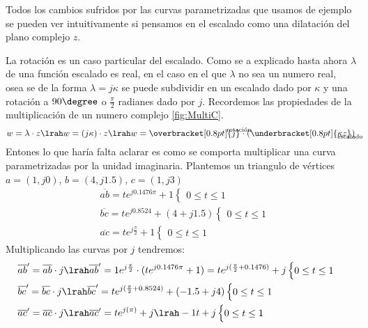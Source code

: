 Todos los cambios sufridos por las curvas parametrizadas que usamos de ejemplo se pueden ver intuitivamente si pensamos en el escalado como una dilatación del plano complejo $z$.
\begin{figure}[H]
    \centering
    
    \label{fig:EscaF3}
\end{figure}
La rotación es un caso particular del escalado. Como se a explicado hasta ahora $\lambda$ de una función escalado es real, en el caso en el que $\lambda$ no sea un numero real, osea se de la forma $\lambda=j\kappa$ se puede subdividir en un escalado dado por $\kappa$ y una rotación a $90\degree$ o $\frac{\pi}{2}$ radianes dado por $j$. Recordemos las propiedades de la multiplicación de un numero complejo \ref{fig:MultiC}.
\begin{equation}
    w=\lambda\cdot z\lrah w=(j\kappa)\cdot z\lrah w=\overbracket[0.8pt]{j}^\text{\clap{rotación~}}\cdot(\underbracket[0.8pt]{\kappa z}_\text{\clap{escalado~}})
\end{equation} 
Entones lo que haría falta aclarar es como se comporta multiplicar una curva parametrizadas por la unidad imaginaria.
Plantemos un triangulo de vértices $a=(1,j0)$, $b=(4,j1.5)$, $c=(1,j3)$
\begin{equation}
\begin{aligned}
    &\overline{ab}=te^{j0.1476\pi}+1\begin{cases}
        0\leq t\leq1
    \end{cases}\\
    &\overline{bc}=te^{j0.8524}+(4+j1.5)\begin{cases}
        0\leq t\leq1
    \end{cases}\\
    &\overline{ac}=te^{j\frac{\pi}{2}}+1\begin{cases}
        0\leq t\leq1
    \end{cases}
\end{aligned}
\end{equation}
Multiplicando las curvas por $j$ tendremos:
\begin{equation}
\begin{aligned}
    &\overline{ab}'=\overline{ab}\cdot j\lrah \overline{ab}'=1e^{j\frac{\pi}{2}}\cdot(te^{j0.1476\pi}+1)=te^{j(\frac{\pi}{2}+0.1476)}+j\begin{cases}
        0\leq t\leq1
    \end{cases}\\
    &\overline{bc}'=\overline{bc}\cdot j\lrah \overline{bc}'=te^{j(\frac{\pi}{2}+0.8524)}+(-1.5+j4)\begin{cases}
        0\leq t\leq1
    \end{cases}\\
    &\overline{ac}'=\overline{ac}\cdot j\lrah \overline{ac}'=te^{j(\pi)}+j\lrah-1t+j\begin{cases}
        0\leq t\leq1
    \end{cases}
\end{aligned}
\end{equation}
